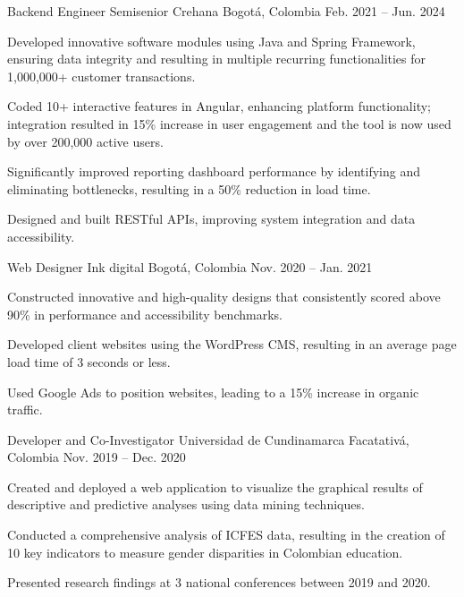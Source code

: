 \documentclass[]{awesome-cv}
\begin{document}
\begin{cventries}
	\cventry
	{Backend Engineer Semisenior}
	{Crehana}
	{Bogotá, Colombia}
	{Feb. 2021 – Jun. 2024}
	{\begin{cvitems}
		\vspace{0.5mm}
		\item {Developed innovative software modules using Java and Spring Framework, ensuring data integrity and resulting in multiple recurring functionalities for 1,000,000+ customer transactions.}
		\item {Coded 10+ interactive features in Angular, enhancing platform functionality; integration resulted in 15\% increase in user engagement and the tool is now used by over 200,000 active users.}
		\item {Significantly improved reporting dashboard performance by identifying and eliminating bottlenecks, resulting in a 50\% reduction in load time.}
		\item {Designed and built RESTful APIs, improving system integration and data accessibility.}
		\end{cvitems}}

	\cventry
	{Web Designer}
	{Ink digital}
	{Bogotá, Colombia}
	{Nov. 2020 – Jan. 2021}
	{\begin{cvitems}
		\vspace{0.5mm}
		\item {Constructed innovative and high-quality designs that consistently scored above 90\% in performance and accessibility benchmarks.}
		\item {Developed client websites using the WordPress CMS, resulting in an average page load time of 3 seconds or less.}
		\item {Used Google Ads to position websites, leading to a 15\% increase in organic traffic.}
		\end{cvitems}}

	\cventry
	{Developer and Co-Investigator}
	{Universidad de Cundinamarca}
	{Facatativá, Colombia}
	{Nov. 2019 – Dec. 2020}
	{\begin{cvitems}
		\vspace{0.5mm}
		\item {Created and deployed a web application to visualize the graphical results of descriptive and predictive analyses using data mining techniques.}
		\item {Conducted a comprehensive analysis of ICFES data, resulting in the creation of 10 key indicators to measure gender disparities in Colombian education.}
		\item {Presented research findings at 3 national conferences between 2019 and 2020.}
		\end{cvitems}}
\end{cventries}
\end{document}
